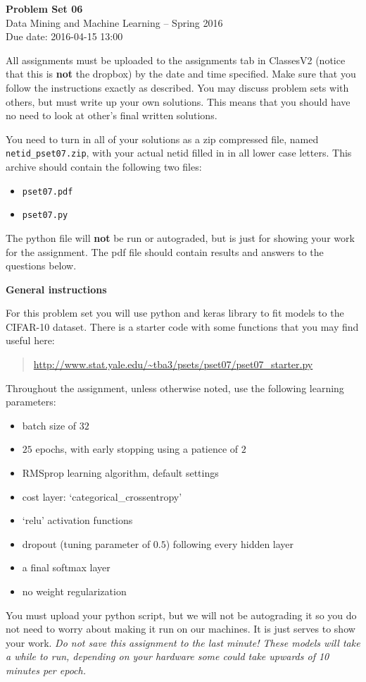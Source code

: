 \documentclass[12pt]{article}
\begin{document}
\begin{center}
{\bf Problem Set 06} \\
Data Mining and Machine Learning -- Spring 2016 \\
Due date: 2016-04-15 13:00
\end{center}

\medskip

All assignments must be uploaded to the assignments tab in ClassesV2
(notice that this is \textbf{not} the dropbox) by the date and time specified.
Make sure that you follow the instructions exactly as described.
You may discuss problem sets with others, but must write up your own
solutions. This means that you should have no need to look at other's
final written solutions.

You need to turn in all of your solutions as a zip compressed file, named
\texttt{netid\_pset07.zip}, with your actual netid filled in in all lower
case letters. This archive should contain the following two files:
\begin{itemize}
\item \texttt{pset07.pdf}
\item \texttt{pset07.py}
\end{itemize}
The python file will \textbf{not} be run or autograded, but is just for
showing your work for the assignment. The pdf file should contain results and
answers to the questions below.

\medskip

\textbf{General instructions}

For this problem set you will use python and keras library to fit models
to the CIFAR-10 dataset.
There is a starter code with some functions that you may find useful here:
\begin{quote}
\url{http://www.stat.yale.edu/~tba3/psets/pset07/pset07_starter.py}
\end{quote}
Throughout the assignment, unless otherwise noted, use the following
learning parameters:
\begin{itemize}
\item batch size of $32$
\item $25$ epochs, with early stopping using a patience of $2$
\item RMSprop learning algorithm, default settings
\item cost layer: `categorical\_crossentropy'
\item `relu' activation functions
\item dropout (tuning parameter of $0.5$) following every hidden layer
\item a final softmax layer
\item no weight regularization
\end{itemize}
You must upload your python script, but we will not be autograding it so
you do not need to worry about making it run on our machines. It is just
serves to show your work. \textit{Do not save this assignment to the last
minute! These models will take a while to run, depending on your hardware
some could take upwards of 10 minutes per epoch.}
\end{document}
